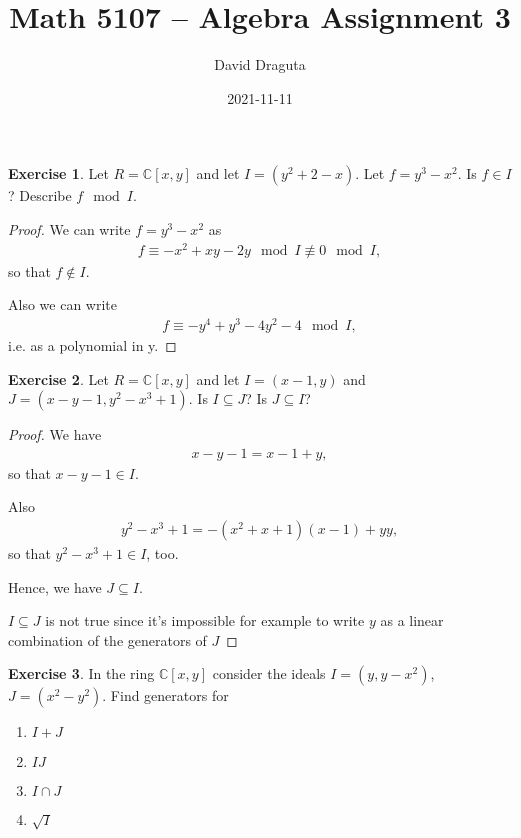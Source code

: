 \documentclass[12pt]{extarticle}
\title{ Math 5107 -- Algebra Assignment 3}
\author{David Draguta}
\date{2021-11-11}
\newcommand{\C}{\mathbb{C}}
\newcommand{\<}{\langle}
\renewcommand{\>}{\rangle}
\theoremstyle{definition}
\newtheorem{exercise}{Exercise}
\begin{document}
\maketitle

\begin{exercise}
  Let $R=\C[x,y]$ and let $I=(y^2+2-x)$. Let $f=y^3-x^2$. Is $f \in I$? Describe $f \mod I$.
\end{exercise}
\begin{proof}
  We can write $f=y^3-x^2$ as
  \begin{align}
    f \equiv -x^2+xy-2y \mod I \not \equiv 0 \mod I ,
  \end{align}
  so that $f \not \in I$.

  Also we can write
  \begin{align*}
    f \equiv -y^4 + y^3 - 4y^2 - 4 \mod I ,
  \end{align*}
  i.e. as a polynomial in y.
\end{proof}
\begin{exercise}
  Let $R=\C[x,y]$ and let $I=(x-1,y)$ and $J=(x-y-1, y^2-x^3+1)$. Is $I \subseteq J$? Is $J \subseteq I$?
\end{exercise}
\begin{proof}
  We have
  \begin{align}
    x-y-1 = x-1 + y,
  \end{align}
  so that $x-y-1 \in I$.

  Also
  \begin{align}
    y^2-x^3+1 = -(x^2+x+1)(x-1) + yy,
  \end{align}
  so that $y^2-x^3+1 \in I$, too.

  Hence, we have $J \subseteq I$.

  $I \subseteq J$ is not true since it's impossible for example to write $y$ as a linear combination of the generators of $J$

\end{proof}

\begin{exercise}
  In the ring $\C[x,y]$ consider the ideals $I = (y,y-x^2)$, $J= (x^2 - y^2)$. Find generators for
  \begin{enumerate}
  \item
    $I + J$
  \item
    $IJ$
  \item
    $I \cap J$
  \item
    $\sqrt{I}$
  \end{enumerate}
\end{exercise}
\end{document}

